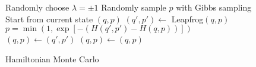\begin{figure}[H]
	\begin{algorithm}[H]
		\caption{Hamiltonian Monte Carlo}\label{algo:hmc}
		\begin{algorithmic}
      \State Randomly choose $\lambda = \pm 1$
      \State Randomly sample $p$ with Gibbs sampling
      \State Start from current state $(q, p)$ 
        \State $(q', p') \leftarrow$ Leapfrog$(q, p)$
      \EndFor
      \State $p = \min \left(1, \exp\left[-\left(H(q',p') - H(q, p)\right)\right]\right)$
        \State $(q, p) \leftarrow (q', p')$
      \Else
        \State $(q, p) \leftarrow (q, p)$
      \EndIf
		\end{algorithmic}
	\end{algorithm}
\end{figure}